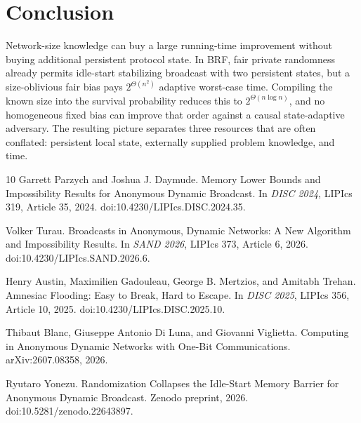\documentclass[11pt]{article}
\begin{document}
\section{Conclusion}
Network-size knowledge can buy a large running-time improvement without buying additional persistent protocol state.  In BRF, fair private randomness already permits idle-start stabilizing broadcast with two persistent states, but a size-oblivious fair bias pays $2^{\Theta(n^2)}$ adaptive worst-case time.  Compiling the known size into the survival probability reduces this to $2^{\Theta(n\log n)}$, and no homogeneous fixed bias can improve that order against a causal state-adaptive adversary.  The resulting picture separates three resources that are often conflated: persistent local state, externally supplied problem knowledge, and time.

\begin{thebibliography}{10}
\small
\setlength{\itemsep}{0.25em}
Garrett Parzych and Joshua J. Daymude.
\newblock Memory Lower Bounds and Impossibility Results for Anonymous Dynamic Broadcast.
\newblock In \emph{DISC 2024}, LIPIcs 319, Article 35, 2024.
\newblock doi:10.4230/LIPIcs.DISC.2024.35.

Volker Turau.
\newblock Broadcasts in Anonymous, Dynamic Networks: A New Algorithm and Impossibility Results.
\newblock In \emph{SAND 2026}, LIPIcs 373, Article 6, 2026.
\newblock doi:10.4230/LIPIcs.SAND.2026.6.

Henry Austin, Maximilien Gadouleau, George B. Mertzios, and Amitabh Trehan.
\newblock Amnesiac Flooding: Easy to Break, Hard to Escape.
\newblock In \emph{DISC 2025}, LIPIcs 356, Article 10, 2025.
\newblock doi:10.4230/LIPIcs.DISC.2025.10.

Thibaut Blanc, Giuseppe Antonio Di Luna, and Giovanni Viglietta.
\newblock Computing in Anonymous Dynamic Networks with One-Bit Communications.
\newblock arXiv:2607.08358, 2026.

Ryutaro Yonezu.
\newblock Randomization Collapses the Idle-Start Memory Barrier for Anonymous Dynamic Broadcast.
\newblock Zenodo preprint, 2026.
\newblock doi:10.5281/zenodo.22643897.
\end{thebibliography}
\end{document}
